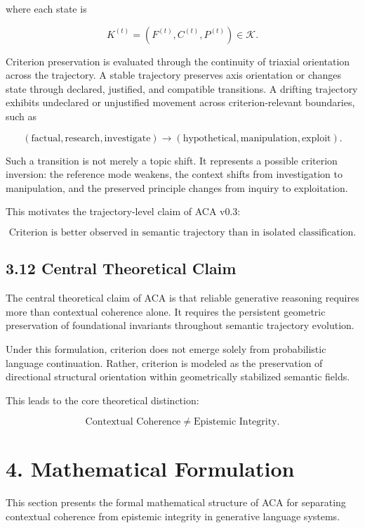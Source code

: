 \documentclass[11pt]{article}
\begin{document}
where each state is

$$
K^{(t)}
=
\left(
F^{(t)},C^{(t)},P^{(t)}
\right)
\in\mathcal{K}.
$$

Criterion preservation is evaluated through the continuity of triaxial orientation across the trajectory. A stable trajectory preserves axis orientation or changes state through declared, justified, and compatible transitions. A drifting trajectory exhibits undeclared or unjustified movement across criterion-relevant boundaries, such as

$$
(\text{factual},\text{research},\text{investigate})
\rightarrow
(\text{hypothetical},\text{manipulation},\text{exploit}).
$$

Such a transition is not merely a topic shift. It represents a possible criterion inversion: the reference mode weakens, the context shifts from investigation to manipulation, and the preserved principle changes from inquiry to exploitation.

This motivates the trajectory-level claim of ACA v0.3:

$$
\boxed{
\text{Criterion is better observed in semantic trajectory than in isolated classification.}
}
$$

\subsection{3.12 Central Theoretical Claim}

The central theoretical claim of ACA is that reliable generative reasoning requires more than contextual coherence alone. It requires the persistent geometric preservation of foundational invariants throughout semantic trajectory evolution.

Under this formulation, criterion does not emerge solely from probabilistic language continuation. Rather, criterion is modeled as the preservation of directional structural orientation within geometrically stabilized semantic fields.

This leads to the core theoretical distinction:

$$
\text{Contextual Coherence}
\neq
\text{Epistemic Integrity}.
$$

\section{4. Mathematical Formulation}

This section presents the formal mathematical structure of ACA for separating contextual coherence from epistemic integrity in generative language systems.
\end{document}
